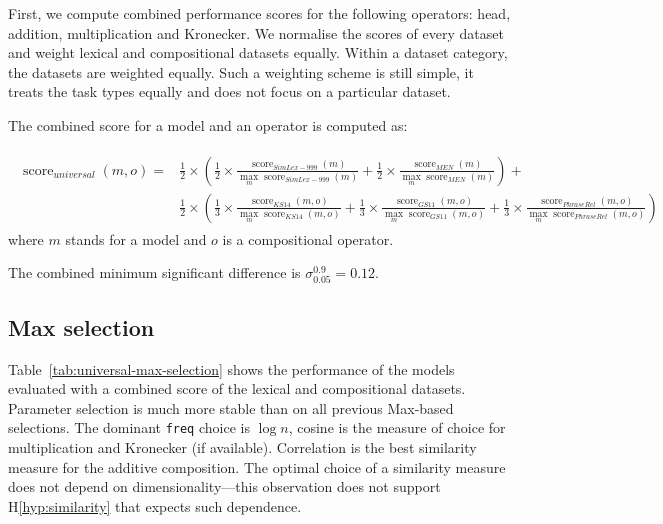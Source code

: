 First, we compute combined performance scores for the following operators: head, addition, multiplication and Kronecker. We normalise the scores of every dataset and weight lexical and compositional datasets equally. Within a dataset category, the datasets are weighted equally. Such a weighting scheme is still simple, it treats the task types equally and does not focus on a particular dataset.

The combined score for a model and an operator is computed as:

{\scriptsize
  \begin{align}
    \begin{split}
\operatorname{score}_\mathit{universal}(\mathit{m}, \mathit{o}) = & %
\frac{1}{2}\times\left(
\frac{1}{2}\times%
\frac{\operatorname{score}_\mathit{SimLex-999}(\mathit{m})}%
{\max_m\operatorname{score}_\mathit{SimLex-999}(m)}%
+%
\frac{1}{2}\times%
\frac{\operatorname{score}_\mathit{MEN}(\mathit{m})}%
{\max_m\operatorname{score}_\mathit{MEN}(m)}%
\right) +
\\
&\frac{1}{2}\times\left(
\frac{1}{3}\times%
\frac{\operatorname{score}_\mathit{KS14}(\mathit{m}, \mathit{o})}%
{\max_m\operatorname{score}_\mathit{KS14}(m, \mathit{o})}%
+%
\frac{1}{3}\times%
\frac{\operatorname{score}_\mathit{GS11}(\mathit{m}, \mathit{o})}%
{\max_m\operatorname{score}_\mathit{GS11}(m, \mathit{o})}%
+%
\frac{1}{3}\times%
\frac{\operatorname{score}_\mathit{PhraseRel}(\mathit{m, \mathit{o}})}%
{\max_m\operatorname{score}_\mathit{PhraseRel}(m, \mathit{o})}%
\right)
\end{split}
\end{align}
}
where $m$ stands for a model and $o$ is a compositional operator.

The combined minimum significant difference is $\sigma^{0.9}_{0.05} = 0.12$.

\subsection{Max selection}
\label{sec:max-selection-universal}

Table~\ref{tab:universal-max-selection} shows the performance of the models evaluated with a combined score of the lexical and compositional datasets.
Parameter selection is much more stable than on all previous Max-based selections. The dominant \texttt{freq} choice is $\log n$, cosine is the measure of choice for multiplication and Kronecker (if available). Correlation is the best similarity measure for the additive composition. The optimal choice of a similarity measure does not depend on dimensionality---this observation does not support H\ref{hyp:similarity} that expects such dependence.

